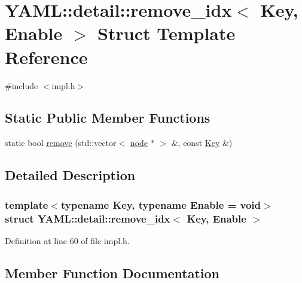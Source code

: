 \hypertarget{struct_y_a_m_l_1_1detail_1_1remove__idx}{}\section{Y\+A\+ML\+::detail\+::remove\+\_\+idx$<$ Key, Enable $>$ Struct Template Reference}
\label{struct_y_a_m_l_1_1detail_1_1remove__idx}


{\ttfamily \#include $<$impl.\+h$>$}

\subsection*{Static Public Member Functions}
\begin{DoxyCompactItemize}
\item 
static bool \mbox{\hyperlink{struct_y_a_m_l_1_1detail_1_1remove__idx_a7fe649be9c08ba162ddd0a0ee942bfb5}{remove}} (std\+::vector$<$ \mbox{\hyperlink{class_y_a_m_l_1_1detail_1_1node}{node}} $\ast$ $>$ \&, const \mbox{\hyperlink{namespace_y_a_m_l_a67c320aa50d3de7ecba1d0b8775dd684a1af533fc24b0311b8c4d5ac2870283aa}{Key}} \&)
\end{DoxyCompactItemize}


\subsection{Detailed Description}
\subsubsection*{template$<$typename Key, typename Enable = void$>$\newline
struct Y\+A\+M\+L\+::detail\+::remove\+\_\+idx$<$ Key, Enable $>$}



Definition at line 60 of file impl.\+h.



\subsection{Member Function Documentation}
\mbox{\label{struct_y_a_m_l_1_1detail_1_1remove__idx_a7fe649be9c08ba162ddd0a0ee942bfb5}} 
